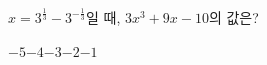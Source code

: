 $x=3^{\frac{1}{3}}-3^{-\frac{1}{3}}$일 때, $3x^3+9x-10$의 값은?
\begin{choices32}{$-5$}{$-4$}{$-3$}{$-2$}{$-1$}\end{choices32}
